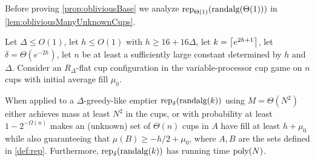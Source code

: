 Before proving \cref{prop:obliviousBase} we analyze
$\operatorname{\text{\textup{rep}}}_{\Theta(1)}(\operatorname{\text{\textup{randalg}}}(\Theta(1)))$ in \cref{lem:obliviousManyUnknownCups}.
\begin{lemma}
  \label{lem:obliviousManyUnknownCups} Let $\Delta \le O(1)$, let
  $h \le O(1)$ with $h \ge 16+16\Delta$, let $k =
  \left\lceil e^{2h+1} \right\rceil$, let $\delta = \Theta(e^{-2h})$, let $n$ be at
  least a sufficiently large constant determined by $h$ and
  $\Delta$. Consider an $R_\Delta$-flat cup configuration in the
  variable-processor cup game on $n$ cups with initial average
  fill $\mu_0$.

  When applied to a $\Delta$-greedy-like emptier
  $\operatorname{\text{\textup{rep}}}_{\delta}(\operatorname{\text{\textup{randalg}}}(k))$ using $M=\Theta(N^2)$ either
  achieves mass at least $N^2$ in the cups, or with probability
  at least $1-2^{-\Omega(n)}$ makes an (unknown) set of
  $\Theta(n)$ cups in $A$ have fill at least $h + \mu_0$ while
  also guaranteeing that $\mu(B) \ge -h/2 + \mu_0$, where $A,B$
  are the sets defined in \cref{def:rep}. Furthermore,
  $\operatorname{\text{\textup{rep}}}_{\delta}(\operatorname{\text{\textup{randalg}}}(k))$ has running time $\operatorname{\text{poly}}(N)$.
\end{lemma}
